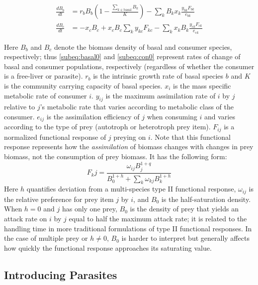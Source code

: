 \documentclass[11pt]{amsart}
\begin{document}
\begin{subequations}\label{eq:atn0}
\begin{align}
\frac{dB_{b}}{dt} &= r_bB_b\left(1-\frac{\sum_{k\in\text{basal}}B_k}{K}\right) - \sum_kB_kx_k\frac{y_{bk}F_{bk}}{e_{bk}}\label{subeq:basal0} \\ 
\frac{dB_{c}}{dt} &= -x_cB_c + x_cB_c\sum_ky_{kc}F_{kc} - \sum_k x_kB_k\frac{y_{ck}F_{ck}}{e_{ck}} \label{subeq:con0}
\end{align}
\end{subequations}

Here $B_b$ and $B_c$ denote the biomass density of basal and consumer species, respectively; thus \eqref{subeq:basal0} and \eqref{subeq:con0} represent rates of change of basal and consumer populations, respectively (regardless of whether the consumer is a free-liver or parasite).  $r_b$ is the intrinsic growth rate of basal species $b$ and $K$ is the community carrying capacity of basal species.  $x_i$ is the mass specific metabolic rate of consumer $i$. $y_{ij}$ is the maximum assimilation rate of $i$ by $j$ relative to $j$'s metabolic rate that varies according to metabolic class of the consumer.  $e_{ij}$ is the assimilation efficiency of $j$ when consuming $i$ and varies according to the type of prey (autotroph or heterotroph prey item).  $F_{ij}$ is a normalized functional response of $j$ preying on $i$.  Note that this functional response represents how the \textit{assimilation} of biomass changes with changes in prey biomass, not the consumption of prey biomass.  It has the following form:
\begin{equation}
F_kj = \frac{\omega_{ij}B_j^{1+q}}{B_0^{1+h} + \sum_k\omega_{kj}B_k^{1+h}}\label{eq:fr0}
\end{equation}
Here $h$ quantifies deviation from a multi-species type II functional response, $\omega_{ij}$ is the relative preference for prey item $j$ by $i$, and $B_0$ is the half-saturation density.  When $h=0$ and $j$ has only one prey, $B_0$ is the density of prey that yields an attack rate on $i$ by $j$ equal to half the maximum attack rate; it is related to the handling time in more traditional formulations of type II functional responses.  In the case of multiple prey or $h\neq0$, $B_0$ is harder to interpret but generally affects how quickly the functional response approaches its saturating value.  

\subsection{Introducing Parasites\label{subsec:paraIntro}}
\end{document}
